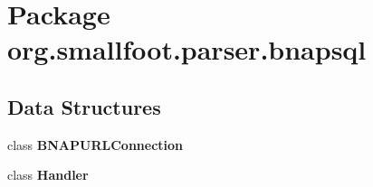 \section{Package org.\+smallfoot.\+parser.\+bnapsql}
\label{namespaceorg_1_1smallfoot_1_1parser_1_1bnapsql}
\subsection*{Data Structures}
\begin{DoxyCompactItemize}
\item 
class {\bf B\+N\+A\+P\+U\+R\+L\+Connection}
\item 
class {\bf Handler}
\end{DoxyCompactItemize}
